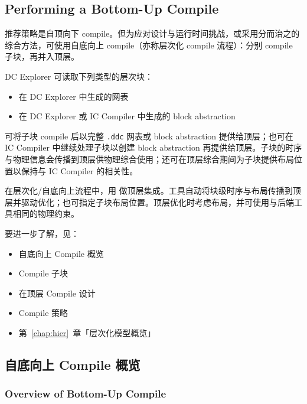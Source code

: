 \subsection*{Performing a Bottom-Up Compile}

推荐策略是自顶向下 compile。但为应对设计与运行时间挑战，或采用分而治之的综合方法，可使用自底向上 compile（亦称层次化 compile 流程）：分别 compile 子块，再并入顶层。

DC Explorer 可读取下列类型的层次块：
\begin{itemize}
  \item 在 DC Explorer 中生成的网表
  \item 在 DC Explorer 或 IC Compiler 中生成的 block abstraction
\end{itemize}

可将子块 compile 后以完整 \texttt{.ddc} 网表或 block abstraction 提供给顶层；也可在 IC Compiler 中继续处理子块以创建 block abstraction 再提供给顶层。子块的时序与物理信息会传播到顶层供物理综合使用；还可在顶层综合期间为子块提供布局位置以保持与 IC Compiler 的相关性。

在层次化/自底向上流程中，用  做顶层集成。工具自动将块级时序与布局传播到顶层并驱动优化；也可指定子块布局位置。顶层优化时考虑布局，并可使用与后端工具相同的物理约束。

要进一步了解，见：
\begin{itemize}
  \item 自底向上 Compile 概览
  \item Compile 子块
  \item 在顶层 Compile 设计
\end{itemize}

\begin{seeAlsoBox}
\begin{itemize}
  \item Compile 策略
  \item 第~\ref{chap:hier}~章「层次化模型概览」
\end{itemize}
\end{seeAlsoBox}

\subsection{自底向上 Compile 概览}
\subsubsection*{Overview of Bottom-Up Compile}

